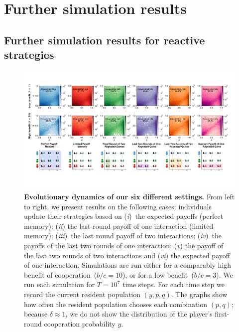 \documentclass[11pt]{article}
\theoremstyle{plainCl1}
\theoremstyle{plainCl2}
\begin{document}
\clearpage




\section{Further simulation results}
\label{section:furthersimulations}


\subsection{Further simulation results for reactive strategies}\label{section:simulation_results}

\begin{figure}[t!]
    \centering 
    \includegraphics[width=\textwidth]{static/more_memory_heatmaps_donation_game_with_illustrations.pdf}
    \caption{\textbf{Evolutionary dynamics of our six different settings.}
    From left to right, we present results on the following cases: individuals update their strategies based on
    ({\it i})~the expected payoffs (perfect memory); ({\it ii}) the last-round payoff
    of one interaction (limited memory); ({\it iii})~the last round payoff of two
    interactions; ({\it iv})~the payoffs of the last two rounds of one interaction; 
    ({\it v}) the payoff of the last two rounds of two interactions and
    ({\it vi}) the expected payoff of one interaction.
    Simulations are run either for a comparably high benefit of cooperation~($b/c\!=\!10$), or for a low benefit~($b/c\!=\!3$).
    We run each simulation for \(T= 10^7\) time steps. For each time step we record the current resident
    population \((y, p, q)\). The graphs show how often the
    resident population chooses each combination \((p, q)\); because $\delta\!\approx\!1$, we do not show the distribution of the player's first-round cooperation probability $y$.}\label{fig:expected_payoffs_results}
    \end{figure}
\end{document}
